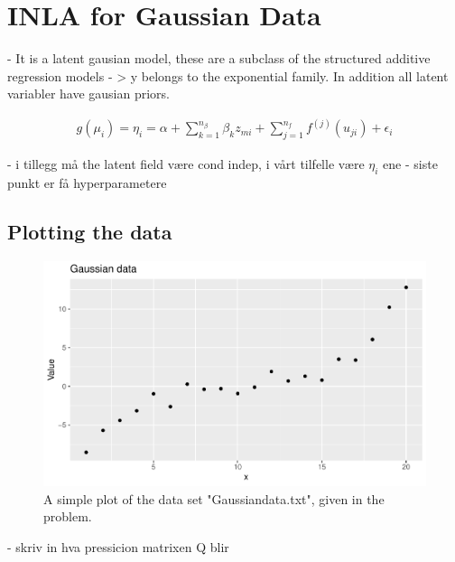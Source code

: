\section{INLA for Gaussian Data}
- It is a latent gausian model, these are a subclass of the structured additive regression models - > y belongs to the exponential family. In addition all latent variabler have gausian priors. 

\begin{equation}
\begin{split}
    g(\mu_i) = \eta_i = \alpha + \sum_{k = 1}^{n_\beta} \beta_k z_{mi} + \sum_{j = 1}^{n_f}f^{(j)}(u_{ji}) + \epsilon_i
\end{split}
\end{equation}

- i tillegg må the latent field være cond indep, i vårt tilfelle være $\eta_i$ ene
- siste punkt er få hyperparametere

\subsection{Plotting the data}
 
\begin{figure}[h]
    \centering
    \includegraphics[width=\textwidth]{Images/gaussian_data.pdf}
    \caption{A simple plot of the data set "Gaussiandata.txt", given in the problem.}
    \label{fig:gaussian_data}
\end{figure}

- skriv in hva pressicion matrixen Q blir

